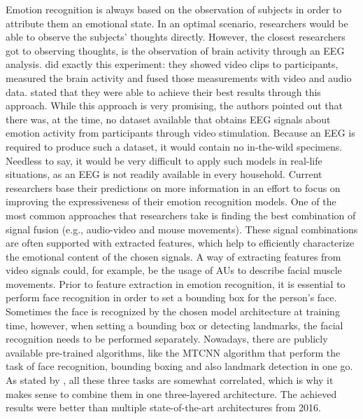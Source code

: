  Emotion recognition is always based on the observation of subjects in order to attribute them an emotional state. In an optimal scenario, researchers would be able to observe the subjects' thoughts directly. However, the closest researchers got to observing thoughts, is the observation of brain activity through an  EEG analysis. \citet{Xing:2019:EEGAudioVisual} did exactly this experiment: they showed video clips to participants, measured the brain activity and fused those measurements with video and audio data. \citet{Xing:2019:EEGAudioVisual} stated that they were able to achieve their best results through this approach.
\newline
While this approach is very promising, the authors pointed out that there was, at the time, no dataset available that obtains EEG signals about emotion activity from participants through video stimulation. Because an EEG is required to produce such a dataset, it would contain no in-the-wild specimens. Needless to say, it would be very difficult to apply such models in real-life situations, as an EEG is not readily available in every household.
\newline\newline
Current researchers base their predictions on more information in an effort to focus on improving the expressiveness of their emotion recognition models. One of the most common approaches that researchers take is finding the best combination of signal fusion (e.g., audio-video and mouse movements). These signal combinations are often supported with extracted features, which help to efficiently characterize the emotional content of the chosen signals. A way of extracting features from video signals could, for example, be the usage of AUs to describe facial muscle movements. 
\newline\newline
Prior to feature extraction in emotion recognition, it is essential to perform face recognition in order to set a bounding box for the person's face. Sometimes the face is recognized by the chosen model architecture at training time, however, when setting a bounding box or detecting landmarks, the facial recognition needs to be performed separately. Nowadays, there are publicly available pre-trained algorithms, like the MTCNN algorithm \citep{Zhang:2016:MTCCN} that perform the task of face recognition, bounding boxing and also landmark detection in one go. As stated by \citet{Zhang:2016:MTCCN}, all these three tasks are somewhat correlated, which is why it makes sense to combine them in one three-layered architecture. The achieved results were better than multiple state-of-the-art architectures from 2016.
